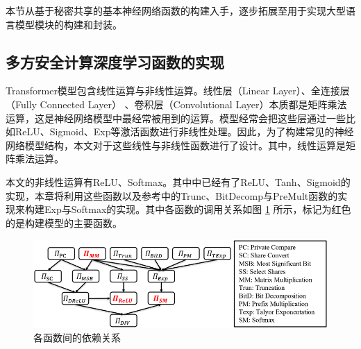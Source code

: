 本节从基于秘密共享的基本神经网络函数的构建入手，逐步拓展至用于实现大型语言模型模块的构建和封装。

\subsection{多方安全计算深度学习函数的实现}



Transformer模型包含线性运算与非线性运算。线性层（Linear Layer）、全连接层（Fully Connected Layer） 、卷积层（Convolutional Layer）本质都是矩阵乘法运算，这是神经网络模型中最经常被用到的运算。模型经常会把这些层通过一些比如ReLU、Sigmoid、Exp等激活函数进行非线性处理。因此，为了构建常见的神经网络模型结构，本文对于这些线性与非线性函数进行了设计。其中，线性运算是矩阵乘法运算。

本文的非线性运算有ReLU、Softmax。其中\cite{SecureNN}\cite{S++}中已经有了ReLU、Tanh、Sigmoid的实现，本章将利用这些函数以及参考\cite{MPC_Fix_Point}中的Trunc、BitDecomp与PreMult函数的实现来构建Exp与Softmax的实现。其中各函数的调用关系如图 \ref{Chap4_Func_All} 所示，标记为红色的是构建模型的主要函数。

\begin{figure}[h]
	\centering
	\includegraphics[width=\linewidth]{figures/Chap4_Func_All.png}
	\caption{各函数间的依赖关系}
	\label{Chap4_Func_All}
\end{figure}

